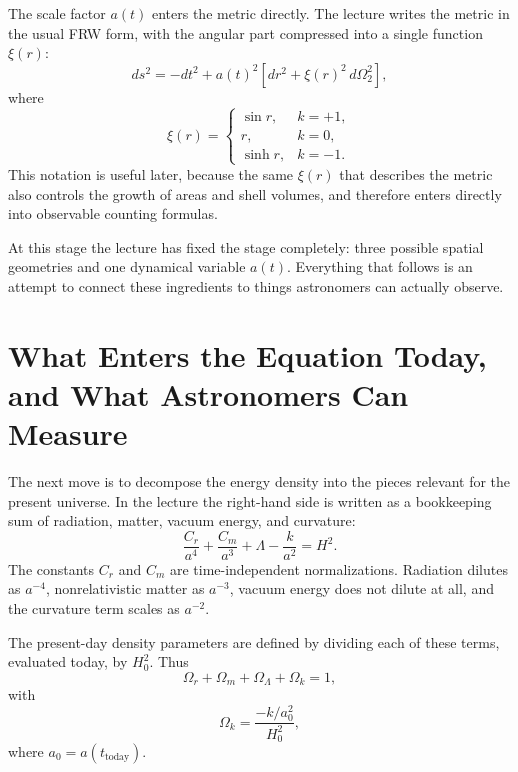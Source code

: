 The scale factor \(a(t)\) enters the metric directly. The lecture writes the metric in the usual FRW form, with the angular part compressed into a single function \(\xi(r)\):
\begin{equation}
ds^2
=
-dt^2+a(t)^2\left[dr^2+\xi(r)^2\,d\Omega_2^2\right],
\end{equation}
where
\begin{equation}
\xi(r)=
\begin{cases}
\sin r, & k=+1,\\[4pt]
r, & k=0,\\[4pt]
\sinh r, & k=-1.
\end{cases}
\end{equation}
This notation is useful later, because the same \(\xi(r)\) that describes the metric also controls the growth of areas and shell volumes, and therefore enters directly into observable counting formulas.

At this stage the lecture has fixed the stage completely: three possible spatial geometries and one dynamical variable \(a(t)\). Everything that follows is an attempt to connect these ingredients to things astronomers can actually observe.

\section{What Enters the Equation Today, and What Astronomers Can Measure}

The next move is to decompose the energy density into the pieces relevant for the present universe. In the lecture the right-hand side is written as a bookkeeping sum of radiation, matter, vacuum energy, and curvature:
\begin{equation}
\frac{C_r}{a^4}+\frac{C_m}{a^3}+\Lambda-\frac{k}{a^2}=H^2.
\end{equation}
The constants \(C_r\) and \(C_m\) are time-independent normalizations. Radiation dilutes as \(a^{-4}\), nonrelativistic matter as \(a^{-3}\), vacuum energy does not dilute at all, and the curvature term scales as \(a^{-2}\).

\begin{definition}
The present-day density parameters are defined by dividing each of these terms, evaluated today, by \(H_0^2\). Thus
\begin{equation}
\Omega_r+\Omega_m+\Omega_\Lambda+\Omega_k=1,
\end{equation}
with
\begin{equation}
\Omega_k=\frac{-k/a_0^2}{H_0^2},
\end{equation}
where \(a_0=a(t_{\mathrm{today}})\).
\end{definition}


